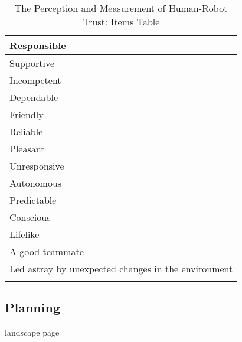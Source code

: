 \begin{longtable}{l}
	Responsible \\ \hline
	Supportive \\ \hline
	Incompetent \\ \hline
	Dependable \\ \hline
	Friendly \\ \hline
	Reliable \\ \hline
	Pleasant \\ \hline
	Unresponsive \\ \hline
	Autonomous \\ \hline
	Predictable \\ \hline
	Conscious \\ \hline
	Lifelike \\ \hline
	A good teammate \\ \hline
	Led astray by unexpected changes in the environment \\
	\caption{The Perception and Measurement of Human-Robot Trust: Items Table}
	\label{tbl:measurement.items.table}	
\end{longtable}

\newpage
\begin{landscape}
	\section{Planning}
	\label{app:Planning}	
	landscape page
\end{landscape}

